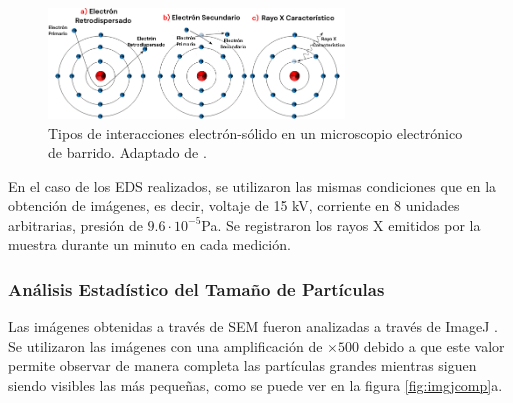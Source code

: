 \documentclass[../main.tex]{subfiles}
\begin{document}
\begin{figure}[H]
    \centering
    \includegraphics[width=0.7\textwidth]{fig/semtipos.png}
    \caption{Tipos de interacciones electrón-sólido en un microscopio electrónico de barrido. Adaptado de \cite{Jensen2022}.}
    \label{semtipos}
\end{figure}
En el caso de los EDS realizados, se utilizaron las mismas condiciones que en la obtención de imágenes, es decir, voltaje de 15 kV, corriente en 8 unidades arbitrarias, presión de $9.6\cdot10^{-5}$Pa. Se registraron los rayos X emitidos por la muestra durante un minuto en cada medición.
\subsubsection{Análisis Estadístico del Tamaño de Partículas} \label{sec:analisisestadistico}
Las imágenes obtenidas a través de SEM fueron analizadas a través de ImageJ \cite{ImageJ}. Se utilizaron las imágenes con una amplificación de $\times500$ debido a que este valor permite observar de manera completa las partículas grandes mientras siguen siendo visibles las más pequeñas, como se puede ver en la figura \ref{fig:imgjcomp}a.
\end{document}

